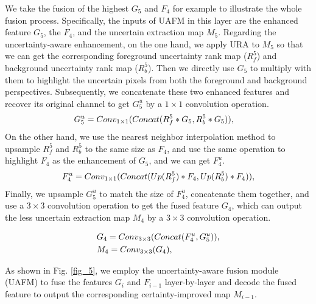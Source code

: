 \documentclass[lettersize,journal]{IEEEtran}
\begin{document}
\par
We take the fusion of the highest $G_{5}$ and $F_{4}$ for example to illustrate the whole fusion process. Specifically, the inputs of UAFM in this layer are the enhanced feature $G_5$, the $F_4$, and the uncertain extraction map $M_5$. Regarding the uncertainty-aware enhancement, on the one hand, we apply URA to $M_{5}$ so that we can get the corresponding foreground uncertainty rank map ($R_{f}^{5}$) and background uncertainty rank map ($R_{b}^{5}$). Then we directly use $G_{5}$ to multiply with them to highlight the uncertain pixels from both the foreground and background perspectives. Subsequently, we concatenate these two enhanced features and recover its original channel to get $G_{5}^{u}$ by a $1\times1$ convolution operation.
\begin{equation}
\centering
\begin{split}
\label{equ7-2} 
    &G_{5}^{u} = Conv_{1\times1}(Concat(R_{f}^{5}*G_{5},R_{b}^{5}*G_{5})),
\end{split}
\end{equation}
On the other hand, we use the nearest neighbor interpolation method to upsample $R_{f}^{5}$ and $R_{b}^{5}$ to the same size as $F_{4}$, and use the same operation to highlight $F_{4}$ as the enhancement of $G_{5}$, and we can get $F_{4}^{u}$. 
\begin{equation}
\centering
\label{equ7-3}
\begin{split}
    &F_{4}^{u} =Conv_{1\times1}(Concat(Up(R_{f}^{5})*F_{4},Up(R_{b}^{5})*F_{4})), \\
\end{split} 
\end{equation}
Finally, we upsample $G_{5}^{u}$ to match the size of $F_{4}^{u}$, concatenate them together, and use a $3\times3$ convolution operation to get the fused feature $G_{4}$, which can output the less uncertain extraction map $M_{4}$ by a $3\times3$ convolution operation.

\begin{equation}
\centering
\label{equ7-4}
\begin{split}
    & G_{4} = Conv_{3\times3}(Concat(F_{4}^{u},G_{5}^{u})), \\
    & M_{4} = Conv_{3\times3} (G_{4}),
\end{split} 
\end{equation}
\par
As shown in Fig. \ref{fig_5}, we employ the uncertainty-aware fusion module (UAFM) to fuse the features $G_i$ and $F_{i-1}$ layer-by-layer and decode the fused feature to output the corresponding certainty-improved map $M_{i-1}$.
\end{document}
